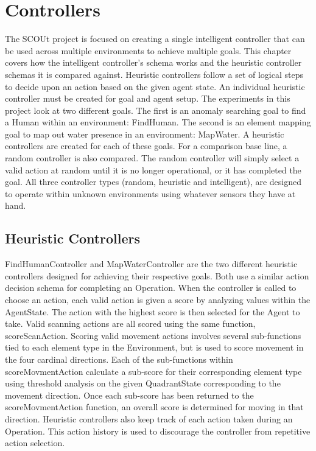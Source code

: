 

\chapter{Controllers} \label{controllers}

The SCOUt project is focused on creating a single intelligent controller that can be used across multiple environments to achieve multiple goals.
This chapter covers how the intelligent controller's schema works and the heuristic controller schemas it is compared against.
Heuristic controllers follow a set of logical steps to decide upon an action based on the given agent state.
An individual heuristic controller must be created for goal and agent setup.
The experiments in this project look at two different goals.
The first is an anomaly searching goal to find a Human within an environment: FindHuman.
The second is an element mapping goal to map out water presence in an environment: MapWater.
A heuristic controllers are created for each of these goals.
For a comparison base line, a random controller is also compared.
The random controller will simply select a valid action at random until it is no longer operational, or it has completed the goal.
All three controller types (random, heuristic and intelligent), are designed to operate within unknown environments using whatever sensors they have at hand.



\section{Heuristic Controllers}
FindHumanController and MapWaterController are the two different heuristic controllers designed for achieving their respective goals.
Both use a similar action decision schema for completing an Operation.
When the controller is called to choose an action, each valid action is given a score by analyzing values within the AgentState.
The action with the highest score is then selected for the Agent to take.
Valid scanning actions are all scored using the same function, scoreScanAction. 
Scoring valid movement actions involves several sub-functions tied to each element type in the Environment, but is used to score movement in the four cardinal directions.
Each of the sub-functions within scoreMovmentAction  calculate a sub-score for their corresponding element type using threshold analysis on the given QuadrantState corresponding to the movement direction. 
Once each sub-score has been returned to the scoreMovmentAction function, an overall score is determined for moving in that direction.
Heuristic controllers also keep track of each action taken during an Operation.
This action history is used to discourage the controller from repetitive action selection.

